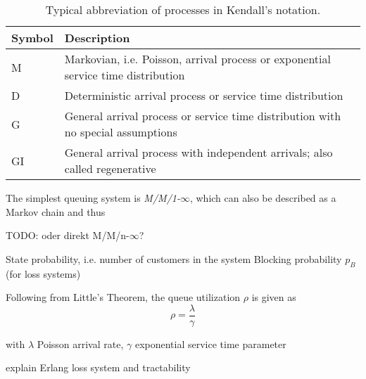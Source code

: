 \begin{table}[htbp]
	\caption{Typical abbreviation of processes in Kendall's notation.}
	\label{c2:tbl:kendalldistributions}
	\begin{tabu}{|l|X[p]|}
	\hline
	Symbol & Description \\ \hline
	M & Markovian, i.e. Poisson, arrival process or exponential service time distribution\\
	D & Deterministic arrival process or service time distribution\\
	G & General arrival process or service time distribution with no special assumptions\\
	GI & General arrival process with independent arrivals; also called regenerative \\ \hline
	\end{tabu} 
\end{table}

The simplest queuing system is \textit{M/M/1-$\infty$}, which can also be described as a Markov chain and thus 

TODO: oder direkt M/M/n-$\infty$?

State probability, i.e. number of customers in the system
Blocking probability $p_B$ (for loss systems)


Following from Little's Theorem, the queue utilization $\rho$ is given as
\begin{equation}
\rho = \frac{\lambda}{\gamma}
\end{equation}

with $\lambda$ Poisson arrival rate, $\gamma$ exponential service time parameter


explain Erlang loss system and tractability